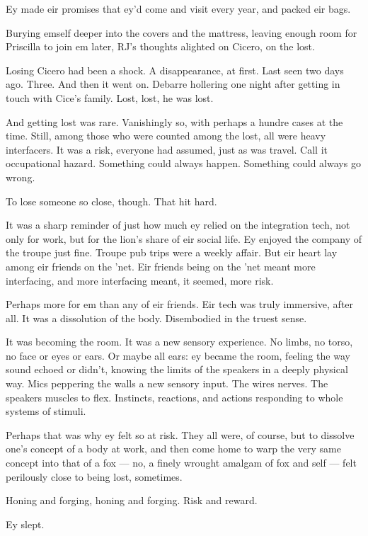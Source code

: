 Ey made eir promises that ey'd come and visit every year, and packed eir bags.

Burying emself deeper into the covers and the mattress, leaving enough room for Priscilla to join em later, RJ's thoughts alighted on Cicero, on the lost.

Losing Cicero had been a shock. A disappearance, at first. Last seen two days ago. Three. And then it went on. Debarre hollering one night after getting in touch with Cice's family. Lost, lost, he was lost.

And getting lost was rare. Vanishingly so, with perhaps a hundre cases at the time. Still, among those who were counted among the lost, all were heavy interfacers. It was a risk, everyone had assumed, just as was travel. Call it occupational hazard. Something could always happen. Something could always go wrong.

To lose someone so close, though. That hit hard.

It was a sharp reminder of just how much ey relied on the integration tech, not only for work, but for the lion's share of eir social life. Ey enjoyed the company of the troupe just fine. Troupe pub trips were a weekly affair. But eir heart lay among eir friends on the 'net. Eir friends being on the 'net meant more interfacing, and more interfacing meant, it seemed, more risk.

Perhaps more for em than any of eir friends. Eir tech was truly immersive, after all. It was a dissolution of the body. Disembodied in the truest sense.

It was becoming the room. It was a new sensory experience. No limbs, no torso, no face or eyes or ears. Or maybe all ears: ey became the room, feeling the way sound echoed or didn't, knowing the limits of the speakers in a deeply physical way. Mics peppering the walls a new sensory input. The wires nerves. The speakers muscles to flex. Instincts, reactions, and actions responding to whole systems of stimuli.

Perhaps that was why ey felt so at risk. They all were, of course, but to dissolve one's concept of a body at work, and then come home to warp the very same concept into that of a fox — no, a finely wrought amalgam of fox and self — felt perilously close to being lost, sometimes.

Honing and forging, honing and forging. Risk and reward.

Ey slept.
